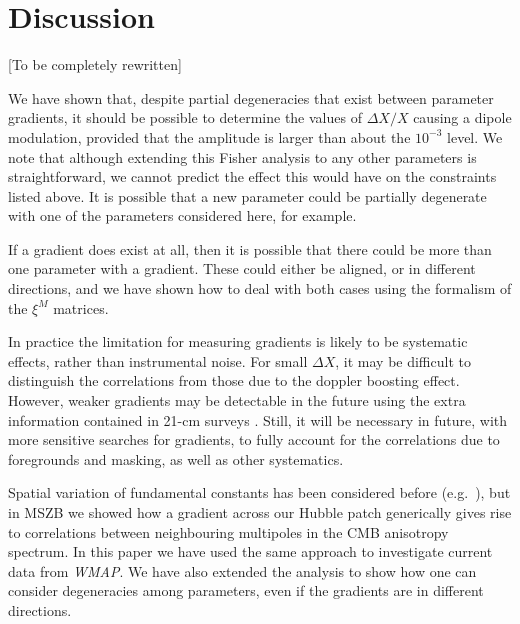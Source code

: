 \documentclass[twocolumn,aps,prd,showpacs]{revtex4}
\newcommand{\note}[1]{{\color{red}[#1]}}
\begin{document}
\section{Discussion}
\note{To be completely rewritten}  

We have shown that, despite partial degeneracies that exist between parameter
gradients, it should be possible to determine the values of $\Delta X/X$
causing a dipole modulation, provided that the amplitude is larger than
about the $10^{-3}$ level. We note that although extending this Fisher
analysis to any other parameters is straightforward, we cannot predict the 
effect this would have on the constraints listed above. It is possible that a 
new parameter could be partially degenerate with
one of the parameters considered here, for example.

If a gradient does exist at all, then it is possible that there could be
more than one parameter with a gradient.  These could either be aligned, or
in different directions, and we have shown how to deal with both cases using
the formalism of the $\xi^M$ matrices.

In practice the limitation for measuring gradients
is likely to be systematic effects, rather than
instrumental noise.  For small $\Delta X$, it 
may be difficult to distinguish the correlations from those due to 
the doppler boosting effect.  However, weaker gradients may be detectable 
in the future using the extra information contained in 21-cm surveys 
\cite{Lewis:2007kz}.  Still, it will be necessary in future, with more sensitive
searches for gradients, to fully account for the correlations due to
foregrounds and masking, as well as other systematics.


Spatial variation of fundamental constants has
been considered before (e.g.~\cite{BarrowOToole01,Donoghue03,Sigurdson03}),
but in MSZB we showed how a gradient across our Hubble patch generically
gives rise to correlations between neighbouring multipoles in the CMB 
anisotropy spectrum.  
In this paper we have used the same approach to investigate current data from
{\it WMAP}.  We have also extended the analysis to show how one can consider
degeneracies among parameters, even if the gradients are in different
directions.
\end{document}
